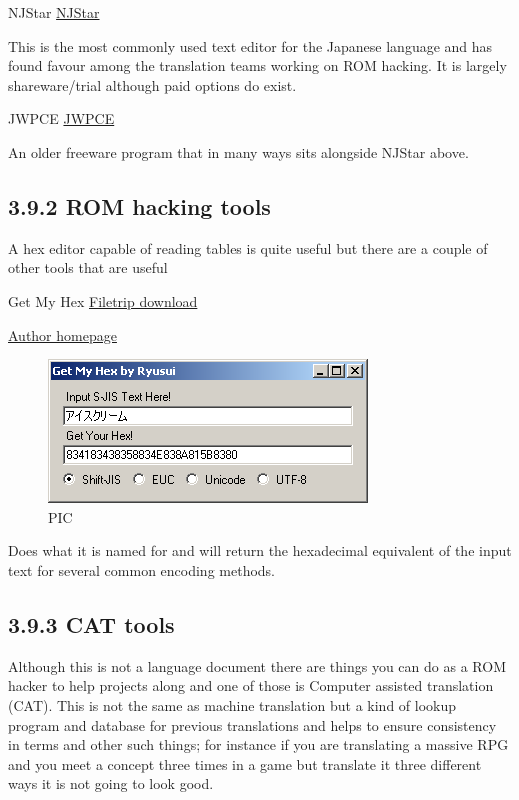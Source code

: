 \documentclass[
]{book}
\begin{document}
NJStar \href{http://www.njstar.com/cms/njstar-japanese-word-processor-download}{NJStar}

This is the most commonly used text editor for the Japanese language and has found favour among the translation teams working on ROM hacking. It is largely shareware/trial although paid options do exist.

JWPCE \href{http://www.physics.ucla.edu/~grosenth/japanese.html}{JWPCE}

An older freeware program that in many ways sits alongside NJStar above.

\hypertarget{rom-hacking-tools}{%
\subsection{3.9.2 ROM hacking tools}\label{rom-hacking-tools}}

A hex editor capable of reading tables is quite useful but there are a couple of other tools that are useful

Get My Hex \href{http://filetrip.net/pc-downloads/applications/download-getmyhex-1500-f29200.html}{Filetrip download}

\href{http://watercrown.info/}{Author homepage}

\begin{figure}
\centering
\includegraphics{images/134_home_fast6191_romhackingguide_unrenamed_files_and_original_borders_romhackingguidegetmyhex1.png}
\caption{PIC}
\end{figure}

Does what it is named for and will return the hexadecimal equivalent of the input text for several common encoding methods.

\hypertarget{cat-tools}{%
\subsection{3.9.3 CAT tools}\label{cat-tools}}

Although this is not a language document there are things you can do as a ROM hacker to help projects along and one of those is Computer assisted translation (CAT). This is not the same as machine translation but a kind of lookup program and database for previous translations and helps to ensure consistency in terms and other such things; for instance if you are translating a massive RPG and you meet a concept three times in a game but translate it three different ways it is not going to look good.
\end{document}

